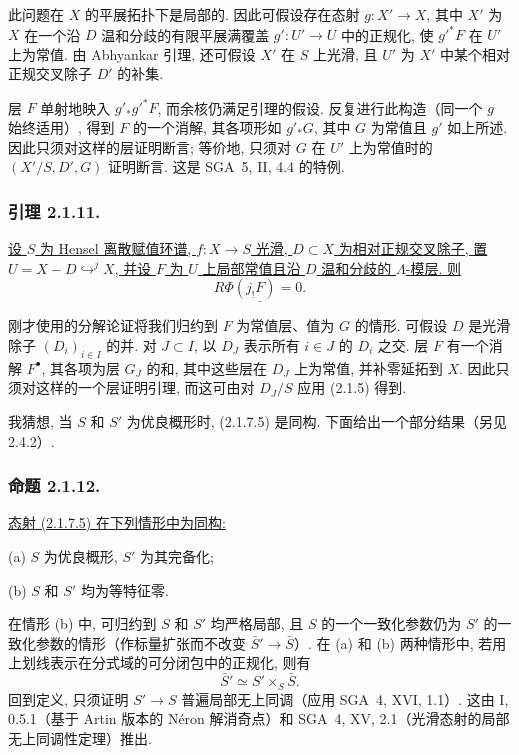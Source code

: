 此问题在 $X$ 的平展拓扑下是局部的. 因此可假设存在态射 $g:X'\longrightarrow X$, 其中 $X'$ 为 $X$ 在一个沿 $D$ 温和分歧的有限平展满覆盖 $g':U'\longrightarrow U$ 中的正规化, 使 $g'^*F$ 在 $U'$ 上为常值. 由 Abhyankar 引理, 还可假设 $X'$ 在 $S$ 上光滑, 且 $U'$ 为 $X'$ 中某个相对正规交叉除子 $D'$ 的补集.

层 $F$ 单射地映入 $g'_*g'^*F$, 而余核仍满足引理的假设. 反复进行此构造（同一个 $g$ 始终适用）, 得到 $F$ 的一个消解, 其各项形如 $g'_*G$, 其中 $G$ 为常值且 $g'$ 如上所述. 因此只须对这样的层证明断言; 等价地, 只须对 $G$ 在 $U'$ 上为常值时的 $(X'/S,D',G)$ 证明断言. 这是 SGA~5, II, 4.4 的特例.

\subsubsection*{引理 2.1.11.}
\underline{设 $S$ 为 Hensel 离散赋值环谱, $f:X\longrightarrow S$ 光滑, $D\subset X$ 为相对正规交叉除子, 置 $U=X-D\mathrel{\mathop{\hookrightarrow}^{j}}X$, 并设 $F$ 为 $U$ 上局部常值且沿 $D$ 温和分歧的 $\Lambda$-模层. 则}
\[
\underline{R\Phi(j_!F)=0.}
\]

刚才使用的分解论证将我们归约到 $F$ 为常值层、值为 $G$ 的情形. 可假设 $D$ 是光滑除子 $(D_i)_{i\in I}$ 的并. 对 $J\subset I$, 以 $D_J$ 表示所有 $i\in J$ 的 $D_i$ 之交. 层 $F$ 有一个消解 $F^\bullet$, 其各项为层 $G_J$ 的和, 其中这些层在 $D_J$ 上为常值, 并补零延拓到 $X$. 因此只须对这样的一个层证明引理, 而这可由对 $D_J/S$ 应用 (2.1.5) 得到.

我猜想, 当 $S$ 和 $S'$ 为优良概形时, (2.1.7.5) 是同构. 下面给出一个部分结果（另见 2.4.2）.

\subsubsection*{命题 2.1.12.}
\underline{态射 (2.1.7.5) 在下列情形中为同构:}

\medskip
\noindent(a) $S$ 为优良概形, $S'$ 为其完备化;

\noindent(b) $S$ 和 $S'$ 均为等特征零.

在情形 (b) 中, 可归约到 $S$ 和 $S'$ 均严格局部, 且 $S$ 的一个一致化参数仍为 $S'$ 的一致化参数的情形（作标量扩张而不改变 $\bar S'\longrightarrow\bar S$）. 在 (a) 和 (b) 两种情形中, 若用上划线表示在分式域的可分闭包中的正规化, 则有
\[
\bar S'\simeq S'\times_S\bar S.
\]
回到定义, 只须证明 $S'\longrightarrow S$ 普遍局部无上同调（应用 SGA~4, XVI, 1.1）. 这由 I, 0.5.1（基于 Artin 版本的 N\'{e}ron 解消奇点）和 SGA~4, XV, 2.1（光滑态射的局部无上同调性定理）推出.


